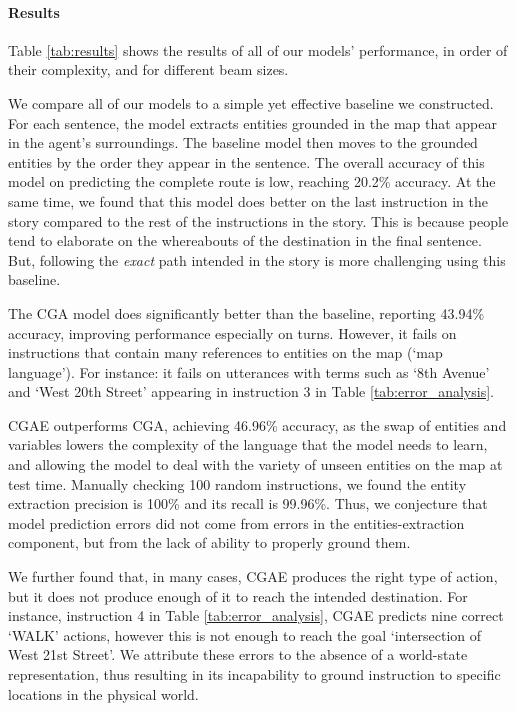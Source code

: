 \documentclass[11pt,a4paper]{article}
\begin{document}
\paragraph{Results}

 Table \ref{tab:results} shows the results of all of our models' performance, in order of their complexity, and for different beam sizes.

We compare all of our models to a simple yet effective baseline  we constructed. For each sentence, the model extracts entities grounded in the map  that appear in the agent's surroundings. The baseline model then moves to the grounded entities by the order they appear in the sentence. The overall accuracy of this model on predicting the complete route is low, reaching 20.2\% accuracy. At the same time,
we found that this model does better on the last instruction in the story compared to the rest of the instructions in the story. This is because people tend to elaborate on the whereabouts of the destination in the final sentence. But, following the {\em exact} path intended in the story is more challenging using this baseline.   

 The CGA model does significantly better than the baseline, reporting  43.94\% accuracy,  improving performance especially on turns. However, it fails on instructions that contain many references to entities on the map (\enquote*{map language}). For instance: it fails on utterances with terms such as \enquote*{8th Avenue} and \enquote*{West 20th Street} appearing in instruction 3 in Table \ref{tab:error_analysis}. 


CGAE outperforms CGA, achieving 46.96\% accuracy, as the swap of entities and variables lowers the complexity of the language that the model needs to learn, and allowing the model to deal with the variety of unseen entities on the map at test time.
Manually checking 100 random instructions, we found the entity extraction precision is 100\% and its recall is 99.96\%. Thus, we conjecture that model prediction errors did not come from errors in the entities-extraction component, but from the lack of ability to properly ground them.

We further found that, in many cases, CGAE produces the right type of action, but it does not produce enough of it to reach the intended destination. For instance, instruction 4 in Table \ref{tab:error_analysis}, CGAE predicts nine correct \enquote*{WALK} actions, however this is not enough to reach the goal \enquote*{intersection of West 21st Street}. We attribute these errors to 
the absence of a world-state representation, thus resulting in its incapability to ground instruction to specific locations in the physical world.
\end{document}
